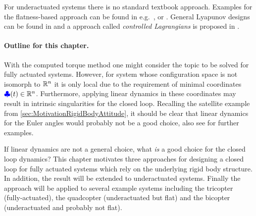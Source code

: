 For underactuated systems there is no standard textbook approach.
Examples for the flatness-based approach can be found in e.g.\ \cite{RathinamFlatness}, \cite{MurrayFlatCataloge} or \cite[sec.\,7.1]{Martin:FlatSystems}.
General Lyapunov designs can be found in \cite{OlfatiSaberDiss} and a approach called \textit{controlled Lagrangians} is proposed in \cite{bloch2000controlled}.

\paragraph{Outline for this chapter.}
With the computed torque method one might consider the topic to be solved for fully actuated systems.
However, for system whose configuration space is not isomorph to $\mathbb{R}^{n}$ it is only local due to the requirement of minimal coordinates $\boldsymbol{\textcolor{blue}{\clubsuit}}(t)\in\mathbb{R}^{n}$.
Furthermore, applying linear dynamics in these coordinates may result in intrinsic singularities for the closed loop.
Recalling the satellite example from \autoref{sec:MotivationRigidBodyAttitude}, it should be clear that linear dynamics for the Euler angles would probably not be a good choice, also see \cite{Konz:AT} for further examples.

If linear dynamics are not a general choice, what \textit{is} a good choice for the closed loop dynamics?
This chapter motivates three approaches for designing a closed loop for fully actuated systems which rely on the underlying rigid body structure.
In addition, the result will be extended to underactuated systems.
Finally the approach will be applied to several example systems including the tricopter (fully-actuated), the quadcopter (underactuated but flat) and the bicopter (underactuated and probably not flat).


